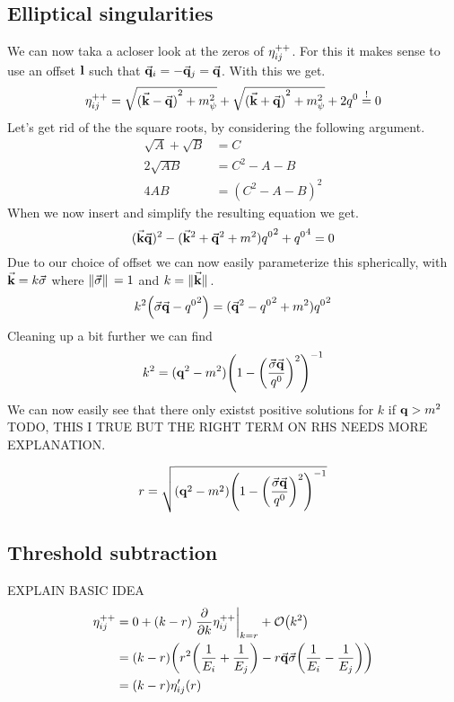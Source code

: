 \subsection{Elliptical singularities}
We can now taka a acloser look at the zeros of $\eta_{ij}^{++}$.
For this it makes sense to use an offset $\vb{l}$ such that $\va{q}_i = -\va{q}_j = \va{q}$.
With this we get.
\begin{equation}
    \eta_{ij}^{++} =  \sqrt{{(\va{k}-\va{q})}^2+m_\psi^2} + \sqrt{{(\va{k}+\va{q})}^2+m_\psi^2} + 2q^0 \overset{!}{=} 0
\end{equation}
Let's get rid of the the square roots, by considering the following argument.
\begin{align}
    \sqrt{A}+\sqrt{B} &= C\\
    2\sqrt{AB} &= C^2-A-B\\
    4AB &= (C^2-A-B)^2
\end{align}
When we now insert and simplify the resulting equation we get.
\begin{equation}
    (\va{k}\va{q})^2-(\va{k}^2+\va{q}^2+m^2){q^0}^2+{q^0}^4 = 0
\end{equation}
Due to our choice of offset we can now easily parameterize this spherically, with $\va{k} = k\va{\sigma}$ where $\norm*{\va{\sigma}} = 1$ and $k = \norm*{\va{k}}$.
\begin{align}
    k^2 \qty(\va{\sigma}\va{q}-{q^0}^2) = (\va{q}^2-{q^0}^2+m^2){q^0}^2
\end{align}
Cleaning up a bit further we can find
\begin{align}
    k^2 = (\vb{q}^2-m^2){\qty(1-{\qty(\frac{\va{\sigma}\va{q}}{q^0})^2})}^{-1}
\end{align}
We can now easily see that there only existst positive solutions for $k$ if $\vb{q}>m^2$
TODO, THIS I TRUE BUT THE RIGHT TERM ON RHS NEEDS MORE EXPLANATION.

\begin{equation}
    r = \sqrt{(\vb{q}^2-m^2){\qty(1-{\qty(\frac{\va{\sigma}\va{q}}{q^0})^2})}^{-1}}
\end{equation}

\subsection{Threshold subtraction}
EXPLAIN BASIC IDEA
\begin{align}
    \ELIPT{i}{j} & = 0 + (k-r) \eval{\pdv{k} \ELIPT{i}{j}}_{k=r} + \order{k^2} \\
    &= (k-r) \qty(r^2 \qty(\frac{1}{E_i}+\frac{1}{E_j})  - r \va{q}\va{\sigma}\qty(\frac{1}{E_i}-\frac{1}{E_j}))\\
    &= (k-r) \eta_{ij}'(r)
\end{align}

